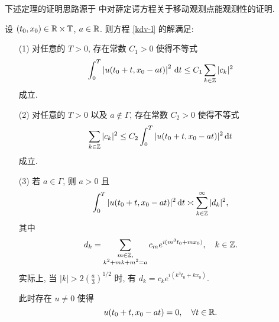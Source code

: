 下述定理的证明思路源于 \cite{jaming2020moving} 中对薛定谔方程关于移动观测点能观测性的证明.
    \begin{theorem}\label{thm-3-3-1}
    设 $(t_0,x_0)\in \mathbb{R}\times \mathbb{T}$, $a\in \mathbb{R}$. 则方程 \eqref{kdv-l} 的解满足:
    \begin{enumerate}
        \item[\rm{(1)}] 对任意的 $T>0$, 存在常数 $C_1>0$ 使得不等式
        \begin{equation}\label{3-2-1}
            \int_0^T\left| u(t_0+t,x_0-at) \right|^2\,\mathrm{d} t \le C_1  \sum_{k\in \mathbb{Z}} |c_k|^2
        \end{equation}
        成立.
        \item[\rm{(2)}] 对任意的 $T>0$ 以及 $a\notin \Gamma$, 存在常数 $C_2>0$ 使得不等式
        \begin{equation}\label{3-2-2}
            \sum_{k\in\mathbb{Z}} |c_k|^2 \le C_2 \int_0^T |u(t_0+t,x_0-at)|^2 \,\mathrm{d} t
        \end{equation}
        成立.
        \item[\rm{(3)}] 若 $a\in \Gamma$, 则 $a>0$ 且
        \begin{equation}\label{3-2-3}
            \int_0^T |u(t_0+t,x_0-at)|^2\,\mathrm{d} t\asymp \sum_{k\in\mathbb{Z}}^\infty|d_k|^2,
        \end{equation}
        其中
        \begin{equation*}
            d_k=\sum_{\substack{
                m\in \mathbb{Z},  \\
                k^2+mk+m^2 = a }} 
             c_me^{i(m^3t_0+mx_0)},\quad k\in \mathbb{Z}.
        \end{equation*}
        实际上, 当 $|k|> 2\left(\frac{a}{3}\right)^{1 /2}$ 时, 有 $d_k=c_k e^{i (k^3t_0+kx_0)}$.
        
        此时存在 $u\neq 0$ 使得
        \begin{equation*}
            u(t_0+t,x_0-at)=0, \quad\forall t\in \mathbb{R}.
        \end{equation*}
    \end{enumerate}
    \end{theorem}
    
